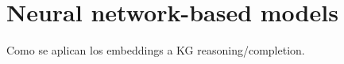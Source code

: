 

\section{Neural network-based models}\label{sec:emb-nn}
Como se aplican los embeddings a KG reasoning/completion. 




